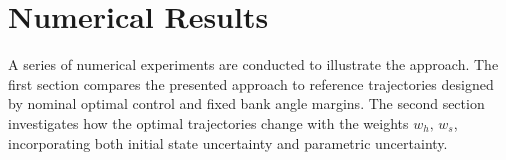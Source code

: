 \documentclass[journal ]{new-aiaa}
\begin{document}
%
%
%

\section*{Numerical Results}
A series of numerical experiments are conducted to illustrate the approach. The first section compares the presented approach to reference trajectories designed by nominal optimal control and fixed bank angle margins. The second section investigates how the optimal trajectories change with the weights $w_h,\,w_s$, incorporating both initial state uncertainty and parametric uncertainty.
\end{document}
